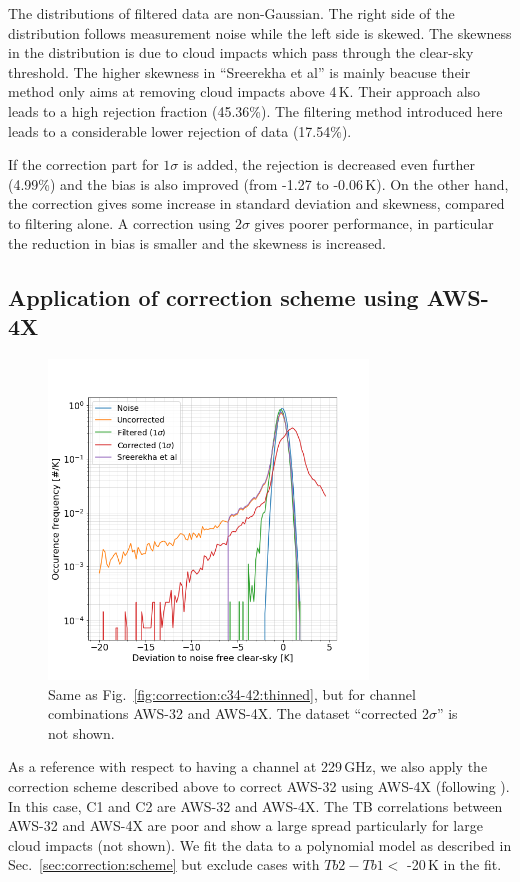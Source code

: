 \documentclass[12pt]{article}
\begin{document}
The distributions of filtered data are non-Gaussian. The right side of the
distribution follows measurement noise while the left side is skewed. The
skewness in the distribution is due to cloud impacts which pass through the
clear-sky threshold. The higher skewness in ``Sreerekha et al'' is mainly
beacuse their method only aims at removing cloud impacts above 4\,K.
Their approach also leads to a high rejection fraction (45.36\%). The filtering
method introduced here leads to a considerable lower rejection of data
(17.54\%).

If the correction part for $1\sigma$ is added, the rejection is decreased even further (4.99\%)
and the bias is also improved (from -1.27 to -0.06\,K). On the other hand, the
correction gives some increase in standard deviation and skewness, compared to
filtering alone. A correction using $2\sigma$ gives poorer performance, in particular the reduction in bias is smaller and the skewness is increased.


%
\subsection{Application of correction scheme using AWS-4X}
%
\begin{figure}[!t]
	\centering
	\includegraphics[height=85mm]{PDF_corrected_AWS-32_AWS-4X_thinned}
	\caption{Same as Fig.~\ref{fig:correction:c34-42:thinned}, but for channel combinations AWS-32 and AWS-4X. The dataset ``corrected 2$\sigma$'' is not shown.  }
	\label{fig:correction:c32-4X:thinned}
\end{figure}
%

As a reference with respect to having a channel at 229\,GHz, we also apply the
correction scheme described above to correct AWS-32 using AWS-4X (following
\citet{rekha2012potential}). In this case, C1 and C2 are AWS-32 and AWS-4X. The
TB correlations between AWS-32 and AWS-4X are poor and show a large spread
particularly for large cloud impacts (not shown). We fit the data to a polynomial model as described in Sec.~\ref{sec:correction:scheme} but exclude cases with $Tb2-Tb1 <$ -20\,K in the fit.
\end{document}
